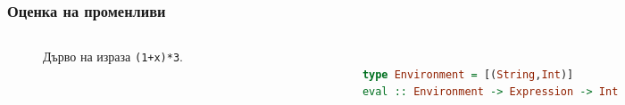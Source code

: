 \documentclass{beamer}
\begin{document}
\begin{frame}[fragile]
  \frametitle{Оценка на променливи}


\begin{columns}[t]
  \begin{column}{0.3\textwidth}

    \begin{figure}
      \centering
      \caption{Дърво на израза \texttt{(1+x)*3}.}
      \label{fig:treeexpr}
      \end{figure}
      

  \end{column}
  \begin{column}{0.7\textwidth}

\begin{lstlisting}[basicstyle=\small,language=Haskell]

type Environment = [(String,Int)]
eval :: Environment -> Expression -> Int     

\end{lstlisting}

  \end{column}
\end{columns}

\end{frame}  


\end{document}
